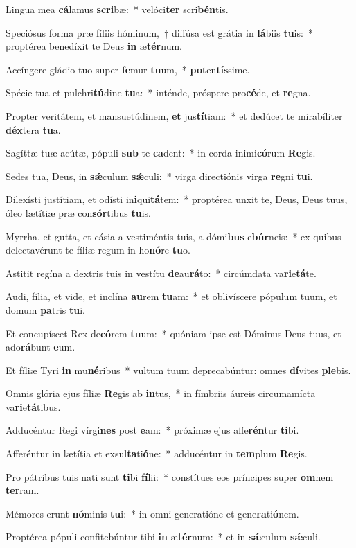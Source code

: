 \item Lingua mea \textbf{cá}lamus \textbf{scri}bæ:~* velóci\textbf{ter} scri\textbf{bén}tis.
\item Speciósus forma præ fíliis hóminum,~† diffúsa est grátia in \textbf{lá}biis \textbf{tu}is:~* proptérea benedíxit te Deus \textbf{in} æ\textbf{tér}num.
\item Accíngere gládio tuo super \textbf{fe}mur \textbf{tu}um,~* \textbf{pot}en\textbf{tís}sime.
\item Spécie tua et pulchri\textbf{tú}dine \textbf{tu}a:~* inténde, próspere pro\textbf{cé}de, et \textbf{re}gna.
\item Propter veritátem, et mansuetúdinem, \textbf{et} jus\textbf{tí}tiam:~* et dedúcet te mirabíliter \textbf{déx}tera \textbf{tu}a.
\item Sagíttæ tuæ acútæ, pópuli \textbf{sub} te \textbf{ca}dent:~* in corda inimi\textbf{có}rum \textbf{Re}gis.
\item Sedes tua, Deus, in \textbf{sǽ}culum \textbf{sǽ}culi:~* virga directiónis virga \textbf{re}gni \textbf{tu}i.
\item Dilexísti justítiam, et odísti in\textbf{i}qui\textbf{tá}tem:~* proptérea unxit te, Deus, Deus tuus, óleo lætítiæ præ con\textbf{sór}tibus \textbf{tu}is.
\item Myrrha, et gutta, et cásia a vestiméntis tuis, a dómi\textbf{bus} e\textbf{búr}neis:~* ex quibus delectavérunt te fíliæ regum in ho\textbf{nó}re \textbf{tu}o.
\item Astitit regína a dextris tuis in vestítu \textbf{de}au\textbf{rá}to:~* circúmdata va\textbf{ri}e\textbf{tá}te.
\item Audi, fília, et vide, et inclína \textbf{au}rem \textbf{tu}am:~* et oblivíscere pópulum tuum, et domum \textbf{pa}tris \textbf{tu}i.
\item Et concupíscet Rex de\textbf{có}rem \textbf{tu}um:~* quóniam ipse est Dóminus Deus tuus, et ado\textbf{rá}bunt \textbf{e}um.
\item Et fíliæ Tyri \textbf{in} mu\textbf{né}ribus~* vultum tuum deprecabúntur: omnes \textbf{dí}vites \textbf{ple}bis.
\item Omnis glória ejus fíliæ \textbf{Re}gis ab \textbf{in}tus,~* in fímbriis áureis circumamícta va\textbf{ri}e\textbf{tá}tibus.
\item Adducéntur Regi vírgi\textbf{nes} post \textbf{e}am:~* próximæ ejus affe\textbf{rén}tur \textbf{ti}bi.
\item Afferéntur in lætítia et exsul\textbf{ta}ti\textbf{ó}ne:~* adducéntur in \textbf{tem}plum \textbf{Re}gis.
\item Pro pátribus tuis nati sunt \textbf{ti}bi \textbf{fí}lii:~* constítues eos príncipes super \textbf{om}nem \textbf{ter}ram.
\item Mémores erunt \textbf{nó}minis \textbf{tu}i:~* in omni generatióne et gene\textbf{ra}ti\textbf{ó}nem.
\item Proptérea pópuli confitebúntur tibi \textbf{in} æ\textbf{tér}num:~* et in \textbf{sǽ}culum \textbf{sǽ}culi.
